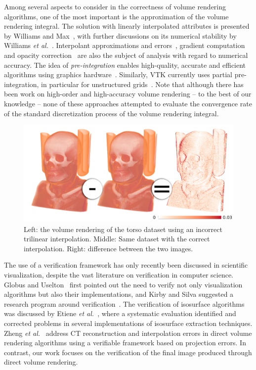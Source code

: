 Among several aspects to consider in the correctness of volume
rendering algorithms, one of the most important is the approximation
of the volume rendering integral. The solution with linearly
interpolated attributes is presented by Williams and
Max~\cite{Williams1992}, with further discussions on its numerical
stability by Williams \emph{et al.}~\cite{Williams1998}.  Interpolant
approximations and
errors~\cite{Hajjar08,Moller:1996:CLE:236226.236235,Moller1997,Novins:1992:CPV:147130.147154},
gradient computation~\cite{Alim2010} and opacity
correction~\cite{Lee2007} are also the subject of analysis with regard
to numerical accuracy. The idea of \emph{pre-integration} enables
high-quality, accurate and efficient algorithms using graphics
hardware~\cite{Engel01,Kye:2008p871,Rottger2000}. Similarly, VTK
currently uses partial pre-integration, in particular for unstructured
grids~\cite{Moreland2004}. Note that although there has been work on
high-order and high-accuracy volume rendering -- to the best of our
knowledge -- none of these approaches attempted to evaluate the convergence
rate of the standard discretization process of the volume rendering integral. 

\begin{figure}[t]
\centering
\includegraphics[width=0.8\linewidth]{chapter5/figures/torso-image.png}
\caption{\label{fig:error-quantification-examples}  Left: 
  the volume rendering of the torso dataset using an incorrect trilinear
  interpolation. Middle: Same dataset with the correct 
  interpolation. Right: difference between the two images.}
\end{figure}

The use of a verification framework has only recently been discussed
in scientific visualization, despite the vast literature on
verification in computer science. Globus and Uselton~\cite{globus95}
first pointed out the need to verify not only visualization algorithms
but also their implementations, and Kirby and Silva suggested a
research program around verification~\cite{kirby-vv-08}. The
verification of isosurface algorithms was discussed by Etiene \emph{et
al.}~\cite{Etiene:2012:TVI:2197070.2197097, etiene:tvcg:2009}, where a systematic evaluation identified and
corrected problems in several implementations of isosurface extraction
techniques.  Zheng \emph{et al.}~\cite{Zheng10} address CT reconstruction and
interpolation errors in direct volume rendering algorithms using a
verifiable framework based on projection errors. In contrast, our work
focuses on the verification of the final image produced through direct
volume rendering.

